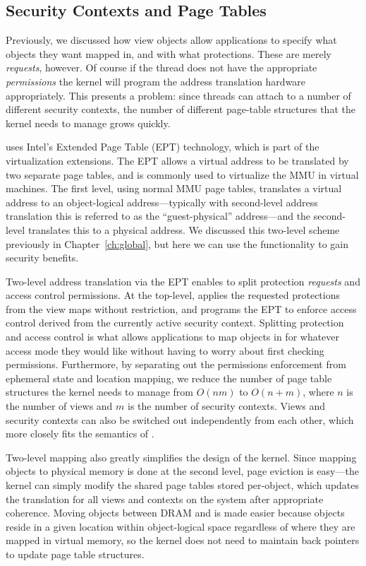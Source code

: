 \subsection{Security Contexts and Page Tables}
\label{sec:secimpl}
Previously, we discussed how view objects allow applications to specify what objects they
want mapped in, and with what protections. These are merely \emph{requests}, however. Of course if
the thread does not have the appropriate \emph{permissions} the kernel will program the address
translation hardware appropriately. This presents a problem: since threads can attach to a number of
different security contexts, the number of different page-table structures that the kernel needs to
manage grows quickly.

\Twizzler uses Intel's Extended Page Table (EPT) technology, which is part of the virtualization
extensions. The EPT allows a virtual address to be translated by two separate page tables, and is
commonly used to virtualize the MMU in virtual machines. The first
level, using normal MMU page tables, translates a virtual address to an object-logical
address---typically with second-level address translation this is referred to as the
``guest-physical'' address---and the second-level translates this to a physical address.
We discussed this two-level scheme previously in Chapter~\ref{ch:global}, but here we can use the functionality to
gain security benefits.

Two-level address translation via the EPT enables \Twizzler to split protection \emph{requests}
and access control permissions. At the top-level, \Twizzler applies the requested protections from
the view maps without restriction, and programs the EPT to enforce access control derived from
the currently active security context. Splitting protection and access control is what allows applications to map
objects in for whatever access mode they would like without having to worry about first checking
permissions.
Furthermore, by separating out the permissions enforcement from ephemeral state and location
mapping, we reduce the number of page table structures the kernel needs to manage
from $O\left(n m\right)$ to $O\left(n + m\right)$, where $n$ is the number of views
and $m$ is the number of security contexts. Views and security contexts can also be switched out
independently from each other, which more closely fits the semantics of \Twizzler.

Two-level mapping also greatly simplifies the design of the kernel. Since mapping objects to physical memory
is done at the second level, page eviction is easy---the kernel can simply modify the shared page
tables stored per-object, which updates the translation for all views and contexts on the system after appropriate coherence. Moving objects between DRAM and \NVM is made easier
because objects reside in a given location within object-logical space regardless of where they are
mapped in virtual memory, so the kernel does not need to maintain back pointers to update page table
structures.


